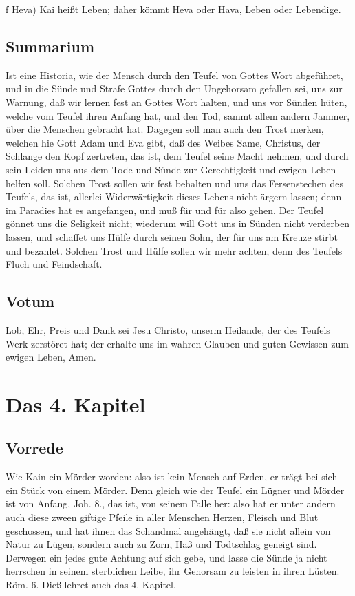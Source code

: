 f Heva) Kai heißt Leben; daher kömmt Heva oder Hava, Leben oder Lebendige.

\section{Summarium}

Ist eine Historia, wie der Mensch durch den Teufel von Gottes Wort abgeführet, und in die Sünde und Strafe Gottes durch den Ungehorsam gefallen sei, uns zur Warnung, daß wir lernen fest an Gottes Wort halten, und uns vor Sünden hüten, welche vom Teufel ihren Anfang hat, und den Tod, sammt allem andern Jammer, über die Menschen gebracht hat. Dagegen soll man auch den Trost merken, welchen hie Gott Adam und Eva gibt, daß des Weibes Same, Christus, der Schlange den Kopf zertreten, das ist, dem Teufel seine Macht nehmen, und durch sein Leiden uns aus dem Tode und Sünde zur Gerechtigkeit und ewigen Leben helfen soll. Solchen Trost sollen wir fest behalten und uns das Fersenstechen des Teufels, das ist, allerlei Widerwärtigkeit dieses Lebens nicht ärgern lassen; denn im Paradies hat es angefangen, und muß für und für also gehen. Der Teufel gönnet uns die Seligkeit nicht; wiederum will Gott uns in Sünden nicht verderben lassen, und schaffet uns Hülfe durch seinen Sohn, der für uns am Kreuze stirbt und bezahlet. Solchen Trost und Hülfe sollen wir mehr achten, denn des Teufels Fluch und Feindschaft.

\section{Votum}

Lob, Ehr, Preis und Dank sei Jesu Christo, unserm Heilande, der des Teufels Werk zerstöret hat; der erhalte uns im wahren Glauben und guten Gewissen zum ewigen Leben, Amen.

\chapter{Das 4. Kapitel}

\section{Vorrede}

Wie Kain ein Mörder worden: also ist kein Mensch auf Erden, er trägt bei sich ein Stück von einem Mörder. Denn gleich wie der Teufel ein Lügner und Mörder ist von Anfang, Joh. 8., das ist, von seinem Falle her: also hat er unter andern auch diese zween giftige Pfeile in aller Menschen Herzen, Fleisch und Blut geschossen, und hat ihnen das Schandmal angehängt, daß sie nicht allein von Natur zu Lügen, sondern auch zu Zorn, Haß und Todtschlag geneigt sind. Derwegen ein jedes gute Achtung auf sich gebe, und lasse die Sünde ja nicht herrschen in seinem sterblichen Leibe, ihr Gehorsam zu leisten in ihren Lüsten. Röm. 6. Dieß lehret auch das 4. Kapitel.

